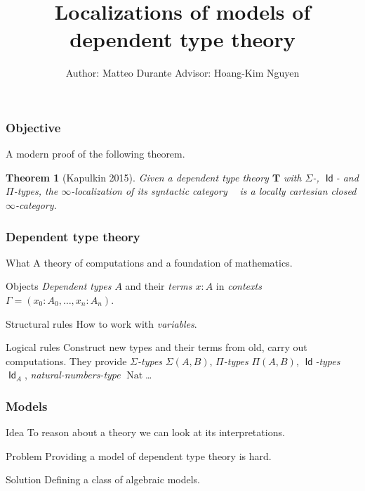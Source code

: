 \documentclass{beamer}
\title{Localizations of models of dependent type theory}
\author{Author: Matteo Durante \quad\quad\quad Advisor: Hoang-Kim Nguyen}
\institute{Regensburg University}
\DeclareMathOperator{\Id}{\mathsf{Id}}
\DeclareMathOperator{\nat}{Nat}
\DeclareMathOperator{\Syn}{\mathsf{Syn}(\mathbf{T})}
\begin{document}
\theoremstyle{plain}

\newtheorem{thm}{Theorem}[section]
\newtheorem{prop}{Proposition}[section]
\newtheorem{defn}{Definition}[section]
\newtheorem{conj}{Conjecture}[section]
\newtheorem{lem}{Lemma}[section]
\newtheorem{construction}{Construction}[section]

\frame{\titlepage}

\begin{frame}
  \frametitle{Objective}

  A modern proof of the following theorem.

  \begin{thm}[Kapulkin 2015]
    Given a dependent type theory $\mathbf{T}$ with $\Sigma$-, $\Id$- and
    $\Pi$-types, the $\infty$-localization of its syntactic category $\Syn$ is a
    locally cartesian closed $\infty$-category.
  \end{thm}
\end{frame}

\begin{frame}
  \frametitle{Dependent type theory}
  
  \begin{block}{What}
    A theory of computations and a foundation of mathematics.
  \end{block}
  \pause

  \begin{block}{Objects}
    \emph{Dependent types $A$} and their \emph{terms $x:A$} in \emph{contexts
    $\Gamma=(x_0:A_0,\ldots,x_n:A_n)$}.
  \end{block}
  \pause

  \begin{block}{Structural rules}
    How to work with \emph{variables}.
  \end{block}
  \pause

  \begin{block}{Logical rules}
    Construct new types and their terms from old, carry out
    computations. They provide \emph{$\Sigma$-types}
    $\Sigma(A,B)$, \emph{$\Pi$-types}
    $\Pi(A,B)$, \emph{$\Id$-types} $\Id_A$, \emph{natural-numbers-type}
    $\nat$\ldots
  \end{block}
\end{frame}

\begin{frame}
  \frametitle{Models}

  \begin{block}{Idea}
    To reason about a theory we can look at its interpretations.
  \end{block}
  \pause

  \begin{block}{Problem}
    Providing a model of dependent type theory is hard.
  \end{block}
  \pause

  \begin{block}{Solution}
    Defining a class of algebraic models.
  \end{block}
\end{frame}
\end{document}
